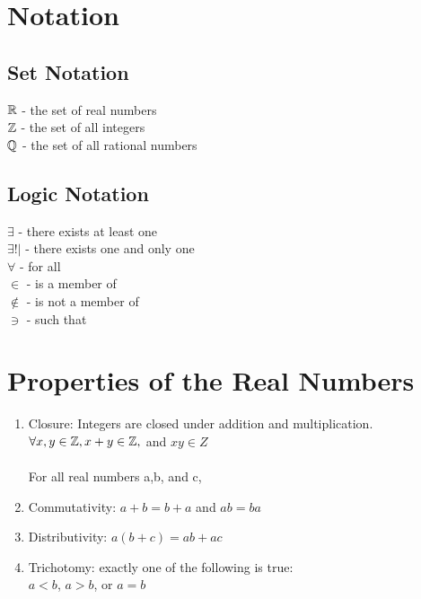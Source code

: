 \documentclass[a4paper]{article}
\begin{document}
\section{Notation}
\subsection{Set Notation}
$\mathbb{R}$ - the set of real numbers\\
$\mathbb{Z}$ - the set of all integers\\
$\mathbb{Q}$ - the set of all rational numbers\\
\subsection{Logic Notation}
$\exists$ - there exists at least one\\
$\exists!|$ - there exists one and only one\\
$\forall$ - for all\\
$\in$ - is a member of\\
$\notin$ - is not a member of\\
$\ni$ - such that\\

\section{Properties of the Real Numbers}
\begin{enumerate}
  \item Closure: Integers are closed under addition and multiplication.\\ $\forall x,y \in \mathbb{Z}, x + y \in \mathbb{Z},$ and $xy \in Z$\\ \\
  For all real numbers a,b, and c,\
  \item Commutativity: $a + b = b + a$ and $ab = ba$
  \item Distributivity: $a(b + c) = ab + ac$
  \item Trichotomy: exactly one of the following is true:\\
  $a < b$, $a > b$, or $a = b$
\end{enumerate}
\end{document}
